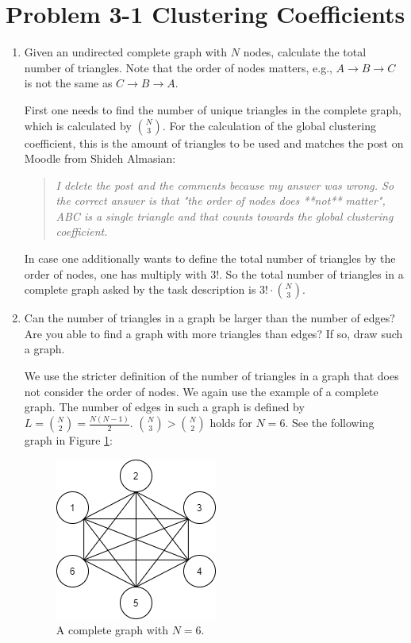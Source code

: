 \section{Problem 3-1 Clustering Coefficients}

\begin{enumerate}
	\item Given an undirected complete graph with $N$ nodes, calculate the total number of triangles. Note that the order of nodes matters, e.g., $A \rightarrow B \rightarrow C$ is not the same as $C \rightarrow B \rightarrow A$.
	
	First one needs to find the number of unique triangles in the complete graph, which is calculated by $\binom{N}{3}$. For the calculation of the global clustering coefficient, this is the amount of triangles to be used and matches the post on Moodle from Shideh Almasian:
	
	\begin{quote}
		\textit{I delete the post and the comments because my answer was wrong. So the correct answer is that "the order of nodes does **not** matter", ABC is a single triangle and that counts towards the global clustering coefficient.}
	\end{quote}

	In case one additionally wants to define the total number of triangles by the order of nodes, one has multiply with $3!$. So the total number of triangles in a complete graph asked by the task description is $3! \cdot \binom{N}{3}$.
	
	\item Can the number of triangles in a graph be larger than the number of edges? Are you able to find a graph with more triangles than edges? If so, draw such a graph.
	
	We use the stricter definition of the number of triangles in a graph that does not consider the order of nodes. We again use the example of a complete graph. The number of edges in such a graph is defined by $L=\binom{N}{2}=\frac{N(N-1)}{2}$. $\binom{N}{3} > \binom{N}{2}$ holds for $N=6$. See the following graph in Figure \ref{clique}:
	
	\begin{figure}[h]
		\centering
		\includegraphics[width=0.25\linewidth]{images/clique.png}
		\caption{A complete graph with $N=6$.}
		\label{clique}
	\end{figure}


\end{enumerate}
